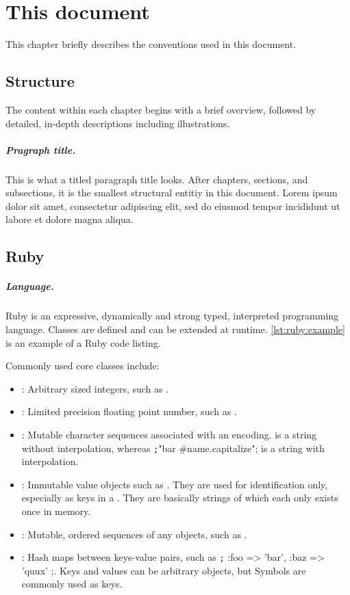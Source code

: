 \chapter{This document}
This chapter briefly describes the conventions used in this document.

\section{Structure}
The content within each chapter begins with a brief overview,
followed by detailed, in-depth descriptions including illustrations.

\paragraph*{Pragraph title.} This is what a titled paragraph title looks. After
chapters, sections, and subsections, it is the smallest structural entitiy in
this document.
Lorem ipsum dolor sit amet, consectetur adipiscing elit, sed do
eiusmod tempor incididunt ut labore et dolore magna aliqua.

\section{Ruby}
\paragraph*{Language.} Ruby is an expressive, dynamically and strong typed, interpreted
programming language. Classes are defined and can be extended at runtime.
\autoref{lst:ruby:example} is an example of a Ruby code listing.

Commonly used core classes include:
\begin{itemize}
	\item {}:
		Arbitrary sized integers, such as .
	\item {}:
		Limited precision floating point number, such as .
	\item {}:
		Mutable character sequences associated with an encoding.
		 is a string without interpolation, whereas
		\texttt;"bar #{name.capitalize}"; is a string with interpolation.
	\item {}:
		Immutable value objects such as . They are used for identification only,
		especially as keys in a . They are basically strings of
		which each only exists once in memory.
	\item {}:
		Mutable, ordered sequences of any objects, such as .
	\item {}:
		Hash maps between keys-value pairs, such as
		\texttt;{ :foo => 'bar', :baz => 'quux' };.
		Keys and values can be arbitrary objects, but Symbols are
		commonly used as keys.
\end{itemize}

